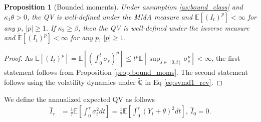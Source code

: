 \documentclass[pdftex,11pt,a4paper] {article}
\newtheorem{proposition}{Proposition}[section]
\begin{document}
\begin{proposition}[Bounded moments]\label{prop:qv_moms}
Under assumption \ref{as:bound_class} and $\kappa_1\theta>0$, the QV is well-defined under the MMA measure and $\mathbb{E}\left[(I_t)^p\right]<\infty$ for any $p$, $|p|\ge 1$. 
If $\kappa_2\ge \beta$, then the QV is well-defined under the inverse measure and $\mathbb{\tilde E}\left[(I_t)^p\right]<\infty$ for any $p$, $|p|\ge 1$. 
\end{proposition} 
\begin{proof}
As $\mathbb{E}[(I_t)^p]=
\mathbb{E}\left[\left(\int_0^t\sigma_s\right)^p\right]\le 
t^p\mathbb{E}\left[\sup_{s\in[0,t]}\sigma_s^p\right]<\infty
$, 
the first statement follows from Proposition \ref{prop:bound_moms}. The second statement follows using the volatility dynamics under $\mathbb{\tilde{Q}}$ in Eq \eqref{eq:svmd1_rev}.
\end{proof}



We define the annualized expected QV as follows
\begin{equation} \label {eq:eqv1}
\begin{split}
\widehat{I}_{\tau}&=\frac{1}{\tau}\mathbb{E}\left[\int^{\tau}_{0}\sigma^{2}_{t}dt\right] = \frac{1}{\tau}\mathbb{E}\left[\int^{\tau}_{0}\left(Y_{t} + \theta\right)^{2}dt\right], \ \widehat{I}_{0}=0. \\
\end{split}
\end{equation}
\end{document}
